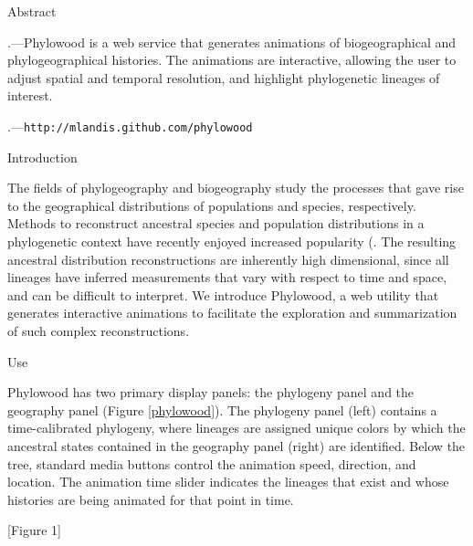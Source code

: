 \documentclass[11pt]{article}
\begin{document}
\newpage

\begin{center}
{\sc Abstract}
\end{center}

.---Phylowood is a web service that generates animations of biogeographical and phylogeographical histories. The animations are interactive, allowing the user to adjust spatial and temporal resolution, and highlight phylogenetic lineages of interest.

.---\texttt{http://mlandis.github.com/phylowood}

\bigskip


\begin{center}
{\sc Introduction}
\end{center}

The fields of phylogeography and biogeography study the processes that gave rise to the geographical distributions of populations and species, respectively. Methods to reconstruct ancestral species and population distributions in a phylogenetic context have recently enjoyed increased popularity (\citep{ronquist97, ree08, lemmon08, lemey09, yu10, landis12}. The resulting ancestral distribution reconstructions are inherently high dimensional, since all lineages have inferred measurements that vary with respect to time and space, and can be difficult to interpret. We introduce Phylowood, a web utility that generates interactive animations to facilitate the exploration and summarization of such complex reconstructions.

\bigskip

\begin{center}
{\sc Use}
\end{center}

Phylowood has two primary display panels: the phylogeny panel and the geography panel (Figure \ref{phylowood}). The phylogeny panel (left) contains a time-calibrated phylogeny, where lineages are assigned unique colors by which the ancestral states contained in the geography panel (right) are identified. Below the tree, standard media buttons control the animation speed, direction, and location. The animation time slider indicates the lineages that exist and whose histories are being animated for that point in time.

[Figure 1]
\end{document}
